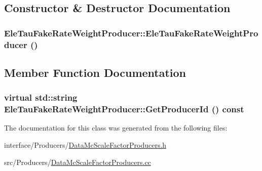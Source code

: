 \subsection{Constructor \& Destructor Documentation}
\hypertarget{classEleTauFakeRateWeightProducer_af5e10aac40d7916caa5d7e006dee6986}{
\subsubsection[{EleTauFakeRateWeightProducer}]{\setlength{\rightskip}{0pt plus 5cm}EleTauFakeRateWeightProducer::EleTauFakeRateWeightProducer ()}}
\label{classEleTauFakeRateWeightProducer_af5e10aac40d7916caa5d7e006dee6986}


\subsection{Member Function Documentation}
\hypertarget{classEleTauFakeRateWeightProducer_a875ef79a66349532388a526b6df0b4c7}{
\subsubsection[{GetProducerId}]{\setlength{\rightskip}{0pt plus 5cm}virtual std::string EleTauFakeRateWeightProducer::GetProducerId () const}}
\label{classEleTauFakeRateWeightProducer_a875ef79a66349532388a526b6df0b4c7}


The documentation for this class was generated from the following files:\begin{DoxyCompactItemize}
\item 
interface/Producers/\hyperlink{DataMcScaleFactorProducers_8h}{DataMcScaleFactorProducers.h}\item 
src/Producers/\hyperlink{DataMcScaleFactorProducers_8cc}{DataMcScaleFactorProducers.cc}\end{DoxyCompactItemize}
